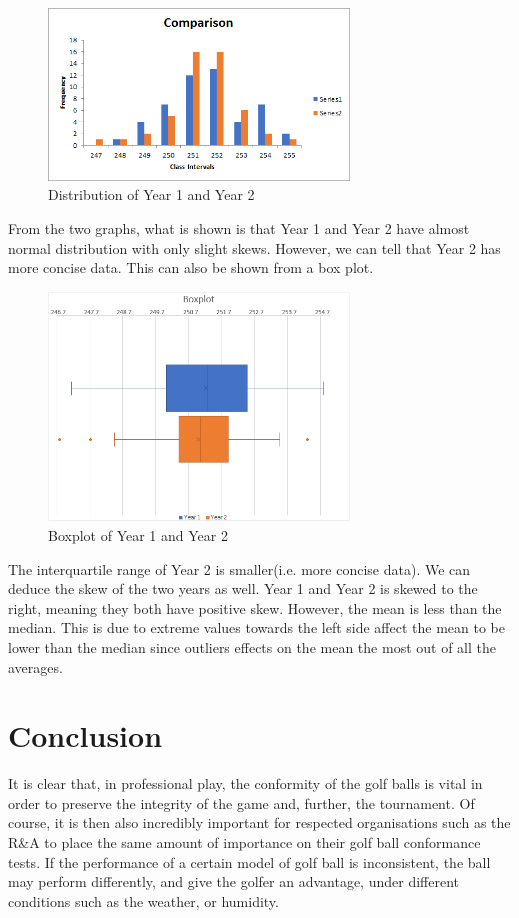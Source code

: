 \documentclass[11pt]{article}
\begin{document}
\begin{figure}[H]
    \centering
    \includegraphics[width=80mm]{Comparison Histogram.png}
    \caption{Distribution of Year 1 and Year 2}
    \label{figure 13}
\end{figure}

From the two graphs, what is shown is that Year 1 and Year 2 have almost normal distribution with only slight skews. However, we can tell that Year 2 has more concise data. This can also be shown from a box plot.

\begin{figure}[H]
    \centering
    \includegraphics[width=80mm]{Boxplot.png}
    \caption{Boxplot of Year 1 and Year 2}
    \label{figure 14}
\end{figure}

The interquartile range of Year 2 is smaller(i.e. more concise data). We can deduce the skew of the two years as well. Year 1 and Year 2 is skewed to the right, meaning they both have positive skew. However, the mean is less than the median. This is due to extreme values towards the left side affect the mean to be lower than the median since outliers effects on the mean the most out of all the averages.

\section{Conclusion}
It is clear that, in professional play, the conformity of the golf balls is vital in order to preserve the integrity of the game and, further, the tournament. Of course, it is then also incredibly important for respected organisations such as the R\&A to place the same amount of importance on their golf ball conformance tests. If the performance of a certain model of golf ball is inconsistent, the ball may perform differently, and give the golfer an advantage, under different conditions such as the weather, or humidity.
\end{document}
